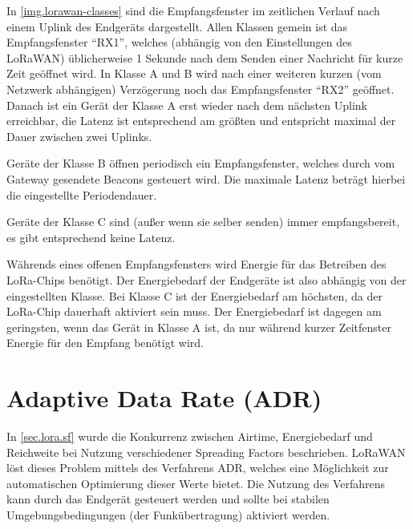 In \autoref{img.lorawan-classes} sind die Empfangsfenster im zeitlichen Verlauf nach einem Uplink des Endgeräts dargestellt.
Allen Klassen gemein ist das Empfangsfenster "`RX1"', welches (abhängig von den Einstellungen des LoRaWAN) üblicherweise 1 Sekunde nach dem Senden einer Nachricht für kurze Zeit geöffnet wird.
In Klasse A und B wird nach einer weiteren kurzen (vom Netzwerk abhängigen) Verzögerung noch das Empfangsfenster "`RX2"' geöffnet.
Danach ist ein Gerät der Klasse A erst wieder nach dem nächsten Uplink erreichbar, die Latenz ist entsprechend am größten und entspricht maximal der Dauer zwischen zwei Uplinks.

Geräte der Klasse B öffnen periodisch ein Empfangsfenster, welches durch vom Gateway gesendete Beacons gesteuert wird.
Die maximale Latenz beträgt hierbei die eingestellte Periodendauer.

Geräte der Klasse C sind (außer wenn sie selber senden) immer empfangsbereit, es gibt entsprechend keine Latenz.

Währends eines offenen Empfangsfensters wird Energie für das Betreiben des LoRa-Chips benötigt.
Der Energiebedarf der Endgeräte ist also abhängig von der eingestellten Klasse.
Bei Klasse C ist der Energiebedarf am höchsten, da der LoRa-Chip dauerhaft aktiviert sein muss.
Der Energiebedarf ist dagegen am geringsten, wenn das Gerät in Klasse A ist, da nur während kurzer Zeitfenster Energie für den Empfang benötigt wird.



\section{Adaptive Data Rate (ADR)}
In \autoref{sec.lora.sf} wurde die Konkurrenz zwischen Airtime, Energiebedarf und Reichweite bei Nutzung verschiedener Spreading Factors beschrieben.
LoRaWAN löst dieses Problem mittels des Verfahrens \gls{ADR}, welches eine Möglichkeit zur automatischen Optimierung dieser Werte bietet.
Die Nutzung des Verfahrens kann durch das Endgerät gesteuert werden und sollte bei stabilen Umgebungsbedingungen (der Funkübertragung) aktiviert werden.
\cite{loraadr}


